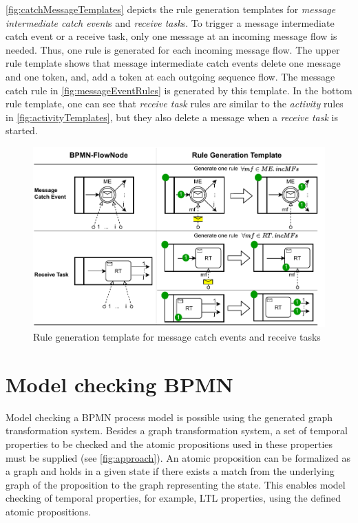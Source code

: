 \documentclass[submission, copyright, creativecommons]{eptcs}
\begin{document}
\autoref{fig:catchMessageTemplates} depicts the rule generation templates for \textit{message intermediate catch event}s and \textit{receive task}s.
To trigger a message intermediate catch event or a receive task, only one message at an incoming message flow is needed.
Thus, one rule is generated for each incoming message flow.
The upper rule template shows that message intermediate catch events delete one message and one token, and, add a token at each outgoing sequence flow.
The message catch rule in \autoref{fig:messageEventRules} is generated by this template.
In the bottom rule template, one can see that \textit{receive task} rules are similar to the \textit{activity} rules in \autoref{fig:activityTemplates}, but they also delete a message when a \textit{receive task} is started.

\begin{figure}[h]
    \centering
    \includegraphics[width=1\textwidth]{images/catch_messages.pdf}
    \caption{Rule generation template for message catch events and receive tasks}
    \label{fig:catchMessageTemplates}
\end{figure}


\section{Model checking BPMN} \label{sec:modelChecking}

Model checking a BPMN process model is possible using the generated graph transformation system.
Besides a graph transformation system, a set of temporal properties to be checked and the atomic propositions used in these properties must be supplied (see \cref{fig:approach}).
An atomic proposition can be formalized as a graph and holds in a given state if there exists a match from the underlying graph of the proposition to the graph representing the state.
This enables model checking of temporal properties, for example, LTL properties, using the defined atomic propositions.
\end{document}
